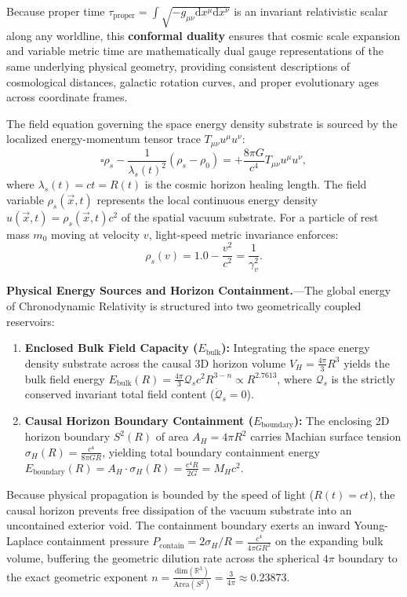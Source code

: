 \documentclass[aps,prd,reprint,superscriptaddress,nofootinbib,floatfix,amsmath,amssymb]{revtex4-2}
\begin{document}
Because proper time $\tau_{\mathrm{proper}} = \int \sqrt{-g_{\mu\nu}\mathrm{d}x^\mu\mathrm{d}x^\nu}$ is an invariant relativistic scalar along any worldline, this \textbf{conformal duality} ensures that cosmic scale expansion and variable metric time are mathematically dual gauge representations of the same underlying physical geometry, providing consistent descriptions of cosmological distances, galactic rotation curves, and proper evolutionary ages across coordinate frames.

The field equation governing the space energy density substrate is sourced by the localized energy-momentum tensor trace $T_{\mu\nu} u^\mu u^\nu$:
\begin{equation}
\square \rho_s - \frac{1}{\lambda_s(t)^2} (\rho_s - \rho_0) = +\frac{8\pi G}{c^4} T_{\mu\nu} u^\mu u^\nu,
\label{eq:field_eq}
\end{equation}
where $\lambda_s(t) = c t = R(t)$ is the cosmic horizon healing length. The field variable $\rho_s(\vec{x}, t)$ represents the local continuous energy density $u(\vec{x}, t) = \rho_s(\vec{x}, t) c^2$ of the spatial vacuum substrate. For a particle of rest mass $m_0$ moving at velocity $v$, light-speed metric invariance enforces:
\begin{equation}
\rho_s(v) = 1.0 - \frac{v^2}{c^2} = \frac{1}{\gamma_v^2}.
\label{eq:velocity_depression}
\end{equation}

\textbf{Physical Energy Sources and Horizon Containment.}---The global energy of Chronodynamic Relativity is structured into two geometrically coupled reservoirs:
\begin{enumerate}
    \item \textbf{Enclosed Bulk Field Capacity ($E_{\text{bulk}}$):} Integrating the space energy density substrate across the causal 3D horizon volume $V_H = \frac{4\pi}{3}R^3$ yields the bulk field energy $E_{\text{bulk}}(R) = \frac{4\pi}{3}\mathcal{Q}_s c^2 R^{3-n} \propto R^{2.7613}$, where $\mathcal{Q}_s$ is the strictly conserved invariant total field content ($\dot{\mathcal{Q}}_s = 0$).
    \item \textbf{Causal Horizon Boundary Containment ($E_{\text{boundary}}$):} The enclosing 2D horizon boundary $S^2(R)$ of area $A_H = 4\pi R^2$ carries Machian surface tension $\sigma_H(R) = \frac{c^4}{8\pi G R}$, yielding total boundary containment energy $E_{\text{boundary}}(R) = A_H \cdot \sigma_H(R) = \frac{c^4 R}{2G} = M_H c^2$.
\end{enumerate}
Because physical propagation is bounded by the speed of light ($R(t)=ct$), the causal horizon prevents free dissipation of the vacuum substrate into an uncontained exterior void. The containment boundary exerts an inward Young-Laplace containment pressure $P_{\text{contain}} = 2\sigma_H / R = \frac{c^4}{4\pi G R^2}$ on the expanding bulk volume, buffering the geometric dilution rate across the spherical $4\pi$ boundary to the exact geometric exponent $n = \frac{\text{dim}(\mathbb{R}^3)}{\text{Area}(S^2)} = \frac{3}{4\pi} \approx 0.23873$.
\end{document}

